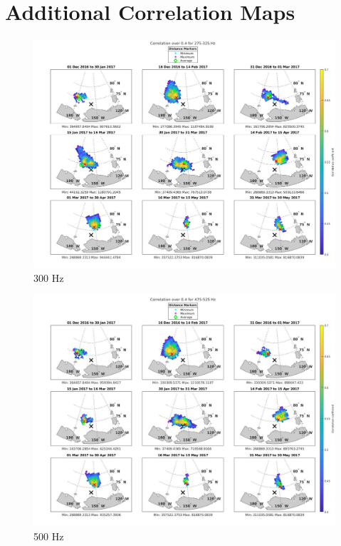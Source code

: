 \pagebreak

\section{Additional Correlation Maps} \label{apdx_maps} 

\begin{figure}[p]
\centering
\includegraphics[scale=0.3]{Figures/megamap_noisland_0.4_300.jpg}
\caption{300 Hz}
\end{figure}

\begin{figure}[p]
\centering
\includegraphics[scale=0.3]{Figures/megamap_noisland_0.4_500.jpg}
\caption{500 Hz}
\end{figure}


